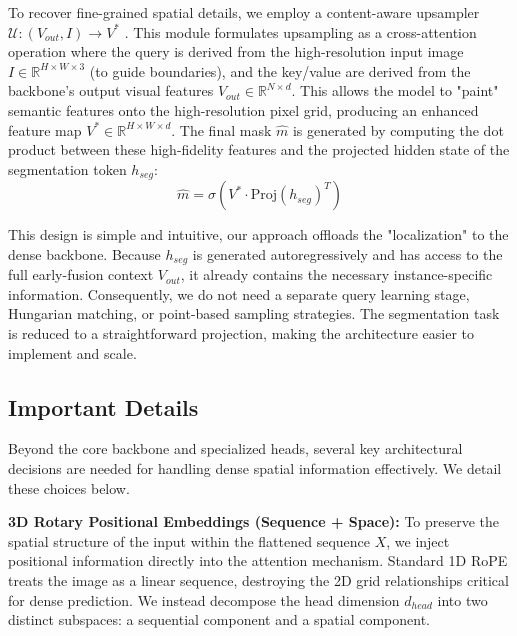 \noindent To recover fine-grained spatial details, we employ a content-aware upsampler $\mathcal{U}: (V_{out}, I) \to V^*$ \citep{wimmer2025anyup}. This module formulates upsampling as a cross-attention operation where the query is derived from the high-resolution input image $I \in \mathbb{R}^{H \times W \times 3}$ (to guide boundaries), and the key/value are derived from the backbone's output visual features $V_{out} \in \mathbb{R}^{N \times d}$. This allows the model to "paint" semantic features onto the high-resolution pixel grid, producing an enhanced feature map $V^* \in \mathbb{R}^{H \times W \times d}$. The final mask $\hat{m}$ is generated by computing the dot product between these high-fidelity features and the projected hidden state of the segmentation token $h_{seg}$:
\begin{equation}
\hat{m} = \sigma(V^* \cdot \text{Proj}(h_{seg})^T)
\end{equation}

\noindent This design is simple and intuitive, our approach offloads the "localization" to the dense backbone. Because $h_{seg}$ is generated autoregressively and has access to the full early-fusion context $V_{out}$, it already contains the necessary instance-specific information. Consequently, we do not need a separate query learning stage, Hungarian matching, or point-based sampling strategies. The segmentation task is reduced to a straightforward projection, making the architecture easier to implement and scale. 

\subsection{Important Details}

\noindent Beyond the core backbone and specialized heads, several key architectural decisions are needed for handling dense spatial information effectively. We detail these choices below.

\noindent \textbf{3D Rotary Positional Embeddings (Sequence + Space):} To preserve the spatial structure of the input within the flattened sequence $X$, we inject positional information directly into the attention mechanism. Standard 1D RoPE treats the image as a linear sequence, destroying the 2D grid relationships critical for dense prediction. We instead decompose the head dimension $d_{head}$ into two distinct subspaces: a sequential component and a spatial component.

